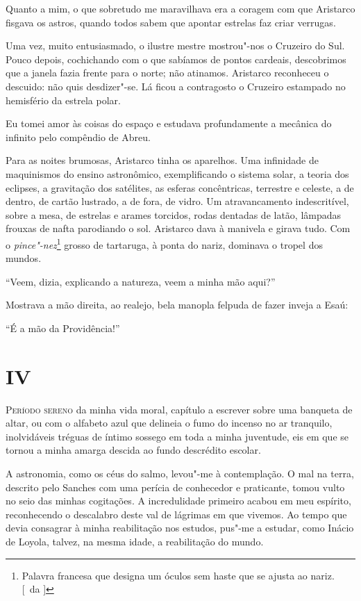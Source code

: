 Quanto a mim, o que sobretudo me maravilhava era a coragem com que Aristarco 
fisgava os astros, quando todos sabem que apontar estrelas faz criar verrugas.
 
Uma vez, muito entusiasmado, o ilustre mestre mostrou"-nos o Cruzeiro do Sul.
Pouco depois, cochichando com o que sabíamos de pontos cardeais,
descobrimos que a janela fazia frente para o norte; não atinamos.
Aristarco reconheceu o descuido: não quis desdizer"-se. Lá ficou a
contragosto o Cruzeiro estampado no hemisfério da estrela polar. 

Eu tomei amor às coisas do espaço e estudava profundamente a mecânica do
infinito pelo compêndio de Abreu. 

Para as noites brumosas, Aristarco tinha os aparelhos. Uma infinidade de
maquinismos do ensino astronômico, exemplificando o sistema solar, a teoria dos
eclipses, a gravitação dos satélites, as esferas concêntricas, terrestre e
celeste, a de dentro, de cartão lustrado, a de fora, de vidro. Um atravancamento
indescritível, sobre a mesa, de estrelas e arames torcidos, rodas dentadas de
latão, lâmpadas frouxas de nafta parodiando o sol.  Aristarco dava à manivela e
girava tudo. Com o \textit{pince"-nez}\footnote{ Palavra francesa que designa um
óculos sem haste que se ajusta ao nariz. [~da ]} grosso de tartaruga, à
ponta do nariz, dominava o tropel dos mundos. 

``Veem, dizia, explicando a natureza, veem a minha mão aqui?'' 

Mostrava a mão direita, ao realejo, bela manopla felpuda de fazer inveja a Esaú: 

``É a mão da Providência!''

\section{IV}

\noindent\textsc{Período sereno} da minha vida moral, capítulo a escrever sobre uma
banqueta de altar, ou com o alfabeto azul que delineia o fumo do
incenso no ar tranquilo, inolvidáveis tréguas de íntimo sossego em toda
a minha juventude, eis em que se tornou a minha amarga descida ao fundo
descrédito escolar. 

A astronomia, como os céus do salmo, levou"-me à
contemplação. O mal na terra, descrito pelo Sanches com uma perícia de
conhecedor e praticante, tomou vulto no seio das minhas cogitações. A
incredulidade primeiro acabou em meu espírito, reconhecendo o
descalabro deste val de lágrimas em que vivemos. Ao tempo que devia
consagrar à minha reabilitação nos estudos, pus"-me a estudar, como
Inácio de Loyola, talvez, na mesma idade, a reabilitação do mundo.


